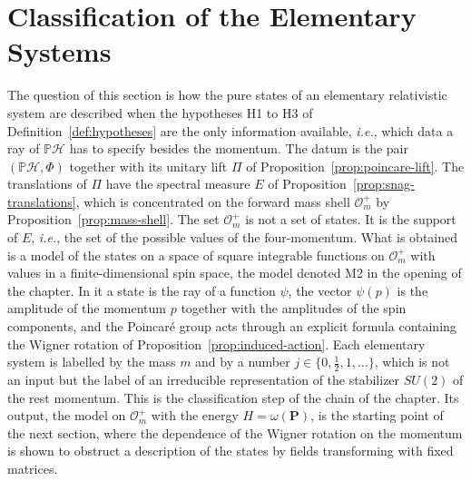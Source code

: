 \section{Classification of the Elementary Systems}
\label{sec:classification}

The question of this section is how the pure states of an elementary relativistic system are described when the hypotheses H1 to H3 of Definition~\ref{def:hypotheses} are the only information available, \textit{i.e.}, which data a ray of $\mathbb{P}\mathcal{H}$ has to specify besides the momentum. The datum is the pair $(\mathbb{P}\mathcal{H},\Phi)$ together with its unitary lift $\Pi$ of Proposition~\ref{prop:poincare-lift}. The translations of $\Pi$ have the spectral measure $E$ of Proposition~\ref{prop:snag-translations}, which is concentrated on the forward mass shell $\mathcal{O}_m^+$ by Proposition~\ref{prop:mass-shell}. The set $\mathcal{O}_m^+$ is not a set of states. It is the support of $E$, \textit{i.e.}, the set of the possible values of the four-momentum. What is obtained is a model of the states on a space of square integrable functions on $\mathcal{O}_m^+$ with values in a finite-dimensional spin space, the model denoted M2 in the opening of the chapter. In it a state is the ray of a function $\psi$, the vector $\psi(p)$ is the amplitude of the momentum $p$ together with the amplitudes of the spin components, and the Poincar\'e group acts through an explicit formula containing the Wigner rotation of Proposition~\ref{prop:induced-action}. Each elementary system is labelled by the mass $m$ and by a number $j\in\{0,\tfrac12,1,\dots\}$, which is not an input but the label of an irreducible representation of the stabilizer $SU(2)$ of the rest momentum. This is the classification step of the chain of the chapter. Its output, the model on $\mathcal{O}_m^+$ with the energy $H=\omega(\mathbf{P})$, is the starting point of the next section, where the dependence of the Wigner rotation on the momentum is shown to obstruct a description of the states by fields transforming with fixed matrices.

